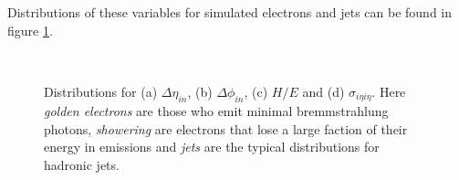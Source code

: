 Distributions of these variables for simulated electrons and jets can be found in figure \ref{FIGURE:PhysicsObjects_Electrons}. 

\begin{figure}[htp]%
\centering
{}\qquad
{}\\
\qquad
{}
\caption[Distributions for the variables $\Delta\eta_{\text in}$, $\Delta\phi_{\text in}$, $\sigma_{i\eta i\eta}$ and $H/E$ for simulated electrons and misidentified jets.]{Distributions for (a) $\Delta\eta_{in}$, (b) $\Delta\phi_{in}$, (c) $H/E$ and (d) $\sigma_{i \eta i \eta}$. Here \textit{golden electrons} are those who emit minimal bremmstrahlung photons, \textit{showering} are electrons that lose a large faction of their energy in emissions and \textit{jets} are the typical distributions for hadronic jets. \cite{ARTICLE:CMSElectronReconstruction}}
\label{FIGURE:PhysicsObjects_Electrons}
\end{figure}

